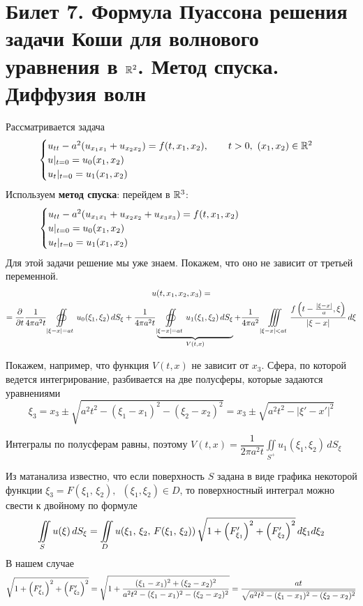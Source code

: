 \documentclass[../main.tex]{subfiles}
\begin{document}
\section{Билет 7. Формула Пуассона решения задачи Коши для волнового уравнения в \texorpdfstring{$\mathbb{R}^2$}{R\textasciicircum 2}. Метод спуска. Диффузия волн}
Рассматривается задача
\begin{equation}
\label{eq::7::cauchy}
\begin{cases}
  u_{tt}-a^2(u_{x_1x_1}+u_{x_2x_2})=f(t,x_1,x_2),\qquad t>0,\ (x_1, x_2)\in \mathbb{R}^2\\
  u|_{t=0}=u_0(x_1, x_2)\\ 
  u_t|_{t=0}=u_1(x_1, x_2)
\end{cases}
\end{equation}
Используем \textbf{метод спуска}: перейдем в $\mathbb{R}^3$:
\begin{equation*}
\begin{cases}
  u_{tt}-a^2(u_{x_1x_1}+u_{x_2x_2}+u_{x_3x_3})=f(t,x_1,x_2) \hspace{7.5em}\\
  u|_{t=0}=u_0(x_1, x_2)\\
  u_t|_{t=0}=u_1(x_1, x_2)
\end{cases}
\end{equation*}
Для этой задачи решение мы уже знаем. Покажем, что оно не зависит от третьей переменной.
\begin{multline*}
u(t, x_1, x_2, x_3) = \\
= \dfrac{\partial }{\partial t} \frac{1}{4\pi a^2t} \oiint\limits_{|\xi-x|=at} u_0(\xi_1, \xi_2)\, dS_\xi 
+\frac{1}{4\pi a^2t}\underbrace{\oiint\limits_{|\xi-x|=at} u_1(\xi_1, \xi_2)\, dS_{\xi}}_{V(t,x)}
+\frac{1}{4\pi a^2}\iiint\limits_{|\xi - x|<at}\frac{f\left(t-\frac{|\xi - x|}{a}, \xi \right)}{|\xi - x|}\, d\xi
\end{multline*}

Покажем, например, что функция $V(t,x)$ не зависит от $x_3$. Сфера, по которой ведется интегрирование, разбивается на две полусферы, которые задаются уравнениями
$$\xi_3=x_3\pm \sqrt{a^2t^2-(\xi_1 -x_1)^2-(\xi_2 -x_2)^2}=x_3\pm \sqrt{a^2t^2-|\xi '-x'|^2}$$

Интегралы по полусферам равны, поэтому $V(t,x)=\dfrac{1}{2\pi a^2t}\displaystyle\iint\limits_{S^+}u_1(\xi_1, \xi_2)\, dS_{\xi}$

Из матанализа известно, что если поверхность $S$ задана в виде графика некоторой функции $\xi_3=F(\xi_1,\, \xi_2),\;\ (\xi_1, \xi_2)\in D$, то поверхностный интеграл можно свести к двойному по формуле
\[
\iint\limits_S u(\xi )\, dS_{\xi}=\iint\limits_D u(\xi_1,\, \xi_2,\, F(\xi_1,\, \xi_2))\, 
\sqrt{1 + \left(F'_{\xi_1}\right)^2 + \left(F'_{\xi_2}\right)^2}\, d\xi_1 d\xi_2
\]
В нашем случае 
$$
\sqrt{1 + \left(F'_{\xi_1}\right)^2 + \left(F'_{\xi_2}\right)^2}
=\sqrt{1+\dfrac{(\xi_1 - x_1)^2+(\xi_2 - x_2)^2}{a^2t^2 - (\xi_1 - x_1)^2-(\xi_2 - x_2)^2}}
=\dfrac{at}{\sqrt{a^2t^2 - (\xi_1 - x_1)^2-(\xi_2 - x_2)^2}}$$
\end{document}
